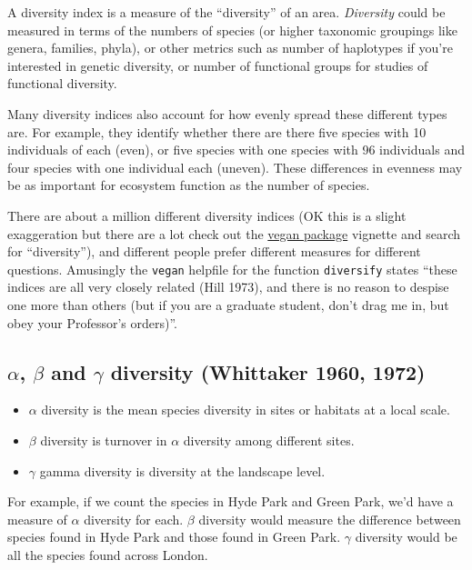 \documentclass[]{book}
\providecommand{\tightlist}{%
  \setlength{\itemsep}{0pt}\setlength{\parskip}{0pt}}
\begin{document}
A diversity index is a measure of the ``diversity'' of an area.
\emph{Diversity} could be measured in terms of the numbers of species
(or higher taxonomic groupings like genera, families, phyla), or other
metrics such as number of haplotypes if you're interested in genetic
diversity, or number of functional groups for studies of functional
diversity.

Many diversity indices also account for how evenly spread these
different types are. For example, they identify whether there are there
five species with 10 individuals of each (even), or five species with
one species with 96 individuals and four species with one individual
each (uneven). These differences in evenness may be as important for
ecosystem function as the number of species.

There are about a million different diversity indices (OK this is a
slight exaggeration but there are a lot check out the
\href{https://cran.r-project.org/web/packages/vegan/vegan.pdf}{vegan
package} vignette and search for ``diversity''), and different people
prefer different measures for different questions. Amusingly the
\texttt{vegan} helpfile for the function \texttt{diversify} states
``these indices are all very closely related (Hill 1973), and there is
no reason to despise one more than others (but if you are a graduate
student, don't drag me in, but obey your Professor's orders)''.

\subsection{\texorpdfstring{\(\alpha\), \(\beta\) and \(\gamma\)
diversity (Whittaker 1960,
1972)}{\textbackslash{}alpha, \textbackslash{}beta and \textbackslash{}gamma diversity (Whittaker 1960, 1972)}}\label{alpha-beta-and-gamma-diversity-whittaker-1960-1972}

\begin{itemize}
\tightlist
\item
  \(\alpha\) diversity is the mean species diversity in sites or
  habitats at a local scale.
\item
  \(\beta\) diversity is turnover in \(\alpha\) diversity among
  different sites.
\item
  \(\gamma\) gamma diversity is diversity at the landscape level.
\end{itemize}

For example, if we count the species in Hyde Park and Green Park, we'd
have a measure of \(\alpha\) diversity for each. \(\beta\) diversity
would measure the difference between species found in Hyde Park and
those found in Green Park. \(\gamma\) diversity would be all the species
found across London.
\end{document}
